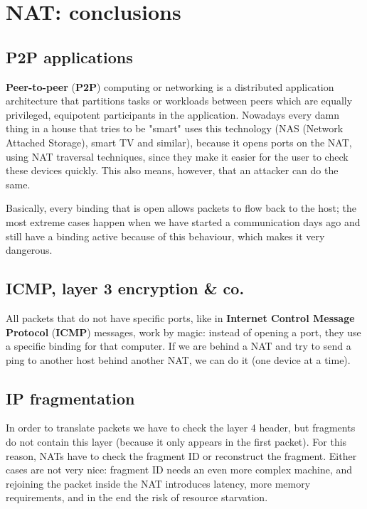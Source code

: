 \section{NAT: conclusions}


\subsection*{P2P applications}
\textbf{Peer-to-peer}  (\textbf{P2P}) computing or networking is a distributed application architecture that partitions tasks or workloads between peers which are equally privileged, equipotent participants in the application. Nowadays every damn thing in a house that tries to be "smart" uses this technology (NAS (Network Attached Storage), smart TV and similar),  because it opens ports on the NAT, using NAT traversal techniques, since they make it easier for the user to check these devices quickly. This also means, however, that an attacker can do the same.

Basically, every binding that is open allows packets to flow back to the host; the most extreme cases happen when we have started a communication days ago and still have a binding active because of this behaviour, which makes it very dangerous.


\subsection*{ICMP, layer 3 encryption \& co.}
All packets that do not have specific ports, like in \textbf{Internet Control Message Protocol} (\textbf{ICMP}) messages, work by magic: instead of opening a port, they use a specific binding for that computer. If we are behind a NAT and try to send a ping to another host behind another NAT, we can do it (one device at a time).


\subsection*{IP fragmentation}
In order to translate packets we have to check the layer 4 header, but fragments do not contain this layer (because it only appears in the first packet). For this reason, NATs have to check the fragment ID or reconstruct the fragment. Either cases are not very nice: fragment ID needs an even more complex machine, and rejoining the packet inside the NAT introduces latency, more memory requirements, and in the end the risk of resource starvation.

